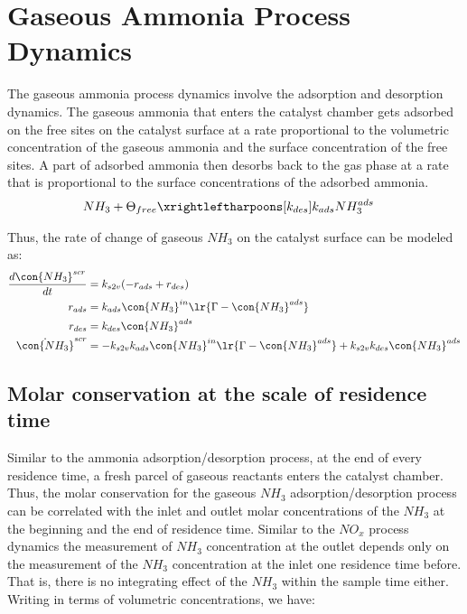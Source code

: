 \newpage
\section{Gaseous Ammonia Process Dynamics}
The gaseous ammonia process dynamics involve the adsorption and desorption dynamics. The gaseous ammonia that enters the
catalyst chamber gets adsorbed on the free sites on the catalyst surface at a rate proportional to the volumetric
concentration of the gaseous ammonia and the surface concentration of the free sites. A part of adsorbed ammonia then
desorbs back to the gas phase at a rate that is proportional to the surface concentrations of the adsorbed ammonia.
\begin{align*}
    NH_3 + \Theta_{free} &\xrightleftharpoons[k_{des}]{k_{ads}} NH_3^{ads}
\end{align*}

Thus, the rate of change of gaseous $NH_3$ on the catalyst surface can be modeled as:
\begin{align*}
    \frac{d \con{NH_3}^{scr}}{dt} &= k_{s2v} (-r_{ads} + r_{des}) \\
    r_{ads} &= k_{ads} \con{NH_3}^{in} \lr{\Gamma - \con{NH_3}^{ads}}\\
    r_{des} &= k_{des} \con{NH_3}^{ads}\\
    \dot{\con{NH_3}}^{scr} &= -k_{s2v}k_{ads} \con{NH_3}^{in} \lr{\Gamma - \con{NH_3}^{ads}} + k_{s2v} k_{des} \con{NH_3}^{ads}\\
\end{align*}

\subsection{Molar conservation at the scale of residence time}

Similar to the ammonia adsorption/desorption process, at the end of every residence time, a fresh parcel of gaseous
reactants enters the catalyst chamber. Thus, the molar conservation for the gaseous $NH_3$ adsorption/desorption process
can be correlated with the inlet and outlet molar concentrations of the $NH_3$ at the beginning and the end of residence
time. Similar to the $NO_x$ process dynamics the measurement of $NH_3$ concentration at the outlet depends only on the
measurement of the $NH_3$ concentration at the inlet one residence time before. That is, there is no integrating effect
of the $NH_3$ within the sample time either. Writing in terms of volumetric concentrations, we have:

